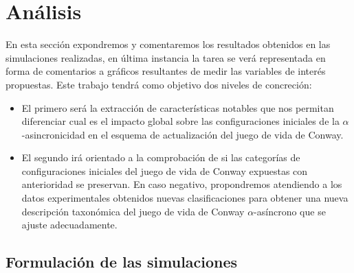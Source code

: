 \documentclass[../proyecto.tex]{memoir}
\begin{document}
\chapter{Análisis}

En esta sección expondremos y comentaremos los resultados obtenidos en las simulaciones realizadas, en última instancia la tarea se verá representada en forma de comentarios a  gráficos resultantes de medir las variables de interés propuestas. Este trabajo tendrá como objetivo dos niveles de concreción:

\begin{itemize}
\item El primero será la extracción de características notables que nos permitan diferenciar cual es el impacto global sobre las configuraciones iniciales de la $\alpha$-asincronicidad en el esquema de actualización del juego de vida de Conway. 

\item El segundo irá orientado a la comprobación de si las categorías de configuraciones iniciales del juego de vida de Conway expuestas con anterioridad se preservan. En caso negativo, propondremos atendiendo a los datos experimentales obtenidos nuevas clasificaciones para obtener una nueva descripción taxonómica del juego de vida de Conway $\alpha$-asíncrono que se ajuste adecuadamente.
\end{itemize}


\section{Formulación de las simulaciones}
\end{document}

